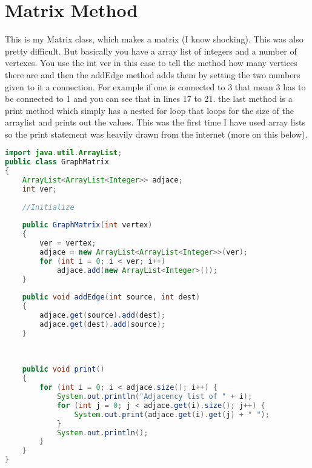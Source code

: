 \documentclass[letterpaper, 10pt]{article}
\begin{document}
\section{Matrix Method}
This is my Matrix class, which makes a matrix (I know shocking). This was also pretty difficult. But basically you have a array list of integers and a number of vertexes. You use the int ver in this case to tell the method how many vertices there are and then the addEdge method adds them by setting the two numbers given to it a connection. For example if one is connected to 3 that mean 3 has to be connected to 1 and you can see that in lines 17 to 21. the last method is a print method which simply has a nested for loop that loops for the size of the arraylist and prints out the values. This was the first time I have used array lists so the print statement was heavily drawn from the internet (more on this below).
\begin{lstlisting}[language = java]
import java.util.ArrayList;
public class GraphMatrix 
{
	ArrayList<ArrayList<Integer>> adjace;
    int ver;
	
	//Initialize
	
	public GraphMatrix(int vertex)
	{
		ver = vertex;
		adjace = new ArrayList<ArrayList<Integer>>(ver);
        for (int i = 0; i < ver; i++)
        	adjace.add(new ArrayList<Integer>());
	}
	
	public void addEdge(int source, int dest)
	{
		adjace.get(source).add(dest);
		adjace.get(dest).add(source);
	}
	
	
	
	public void print()
    {
        for (int i = 0; i < adjace.size(); i++) {
            System.out.println("Adjacency list of " + i);
            for (int j = 0; j < adjace.get(i).size(); j++) {
                System.out.print(adjace.get(i).get(j) + " ");
            }
            System.out.println();
        }
    }
}


\end{lstlisting}
\end{document}
